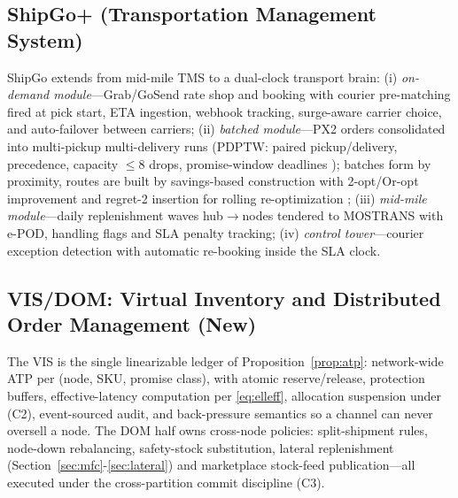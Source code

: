 \documentclass[10pt,twocolumn,letterpaper]{article}
\theoremstyle{definition}
\begin{document}
\subsection{ShipGo+ (Transportation Management System)}
ShipGo extends from mid-mile TMS to a dual-clock transport brain: (i) \emph{on-demand module}---Grab/GoSend rate shop and booking with courier pre-matching fired at pick start, ETA ingestion, webhook tracking, surge-aware carrier choice, and auto-failover between carriers; (ii) \emph{batched module}---PX2 orders consolidated into multi-pickup multi-delivery runs (PDPTW: paired pickup/delivery, precedence, capacity $\le8$ drops, promise-window deadlines \cite{ropke2006}); batches form by proximity, routes are built by savings-based construction \cite{clarke1964} with 2-opt/Or-opt improvement and regret-2 insertion for rolling re-optimization \cite{klapp2018,ropke2006}; (iii) \emph{mid-mile module}---daily replenishment waves hub$\to$nodes tendered to MOSTRANS with e-POD, handling flags and SLA penalty tracking; (iv) \emph{control tower}---courier exception detection with automatic re-booking inside the SLA clock.

\subsection{VIS/DOM: Virtual Inventory and Distributed Order Management (New)}
The VIS is the single linearizable ledger of Proposition~\ref{prop:atp}: network-wide ATP per (node, SKU, promise class), with atomic reserve/release, protection buffers, effective-latency computation per \eqref{eq:elleff}, allocation suspension under (C2), event-sourced audit, and back-pressure semantics so a channel can never oversell a node. The DOM half owns cross-node policies: split-shipment rules, node-down rebalancing, safety-stock substitution, lateral replenishment (Section~\ref{sec:mfc}-\ref{sec:lateral}) and marketplace stock-feed publication---all executed under the cross-partition commit discipline (C3).
\end{document}
